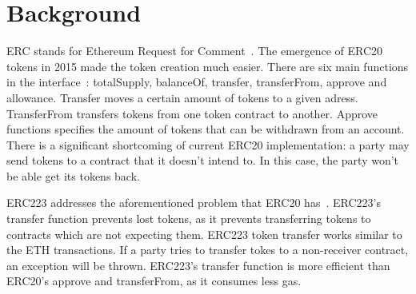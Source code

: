 %

\section{Background}
ERC stands for Ethereum Request for Comment~\cite{comparison}. The emergence of ERC20 tokens in 2015 made the token creation much easier. There are six main functions in the interface~\cite{ERC20}: totalSupply, balanceOf, transfer, transferFrom, approve and allowance. Transfer moves a certain amount of tokens to a given adress. TransferFrom transfers tokens from one token contract to another. Approve functions specifies the amount of tokens that can be withdrawn from an account. There is a significant shortcoming of current ERC20 implementation: a party may send tokens to a contract that it doesn't intend to. In this case, the party won't be able get its tokens back.

ERC223 addresses the aforementioned problem that ERC20 has~\cite{ERC223}. ERC223's transfer function prevents lost tokens, as it prevents transferring tokens to contracts which are not expecting them. ERC223 token transfer works similar to the ETH transactions. If a party tries to transfer tokes to a non-receiver contract, an exception will be thrown. ERC223's transfer function is more efficient than ERC20's approve and transferFrom, as it consumes less gas.

